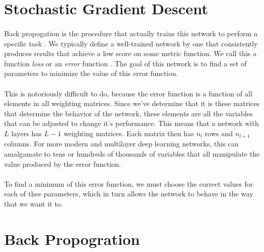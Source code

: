 \documentclass[12pt,letterpaper]{article}
\begin{document}
\paragraph*{}

\section{Stochastic Gradient Descent}
\paragraph*{}Back propogation is the procedure that actually trains this network to perform a specific task \cite{Goodfellow}. We typically define a well-trained network by one that consistently produces results that achieve a low score on some metric function. We call this a function \textit{loss} or an \textit{error } function \cite{James}. The goal of this network is to find a set of parameters to minimize the value of this error function. 
\paragraph*{}This is notoriously difficult to do, because the error function is a function of all elements in all weighting matrices. Since we've determine that it is these matrices that determine the behavior of the network, these elements are all the variables that can be adjusted to change it's performance. This means that a network with $L$ layers has $L-1$ weighting matrices. Each matrix then has $n_l$ rows and $n_{l+1}$ columns. For more modern and multilayer deep learning networks, this can amalgamate to tens or hundreds of thousands of variables \cite{Goodfellow} that all manipulate the value produced by the error function. 
\paragraph*{}To find a minimum of this error function, we must choose the correct values for each of thee parameters, which in turn allows the network to behave in the way that we want it to. 


\section{Back Propogration}
\end{document}
